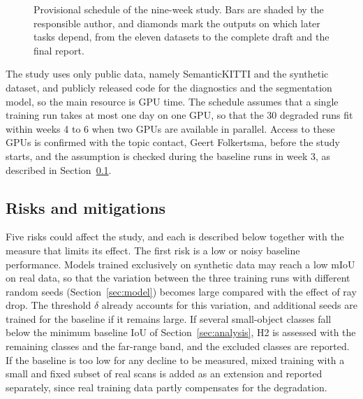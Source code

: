 \begin{figure}[htbp]
\caption{Provisional schedule of the nine-week study. Bars are shaded by the responsible author, and diamonds mark the outputs on which later tasks depend, from the eleven datasets to the complete draft and the final report.}
\label{fig:gantt}
\end{figure}

The study uses only public data, namely SemanticKITTI and the synthetic dataset, and publicly released code for the diagnostics and the segmentation model, so the main resource is GPU time. The schedule assumes that a single training run takes at most one day on one GPU, so that the 30 degraded runs fit within weeks 4 to 6 when two GPUs are available in parallel. Access to these GPUs is confirmed with the topic contact, Geert Folkertsma, before the study starts, and the assumption is checked during the baseline runs in week 3, as described in Section~\ref{sec:risks}.

\subsection{Risks and mitigations}\label{sec:risks}
Five risks could affect the study, and each is described below together with the measure that limits its effect. The first risk is a low or noisy baseline performance. Models trained exclusively on synthetic data may reach a low mIoU on real data, so that the variation between the three training runs with different random seeds (Section~\ref{sec:model}) becomes large compared with the effect of ray drop. The threshold $\delta$ already accounts for this variation, and additional seeds are trained for the baseline if it remains large. If several small-object classes fall below the minimum baseline IoU of Section~\ref{sec:analysis}, H2 is assessed with the remaining classes and the far-range band, and the excluded classes are reported. If the baseline is too low for any decline to be measured, mixed training with a small and fixed subset of real scans is added as an extension and reported separately, since real training data partly compensates for the degradation.

